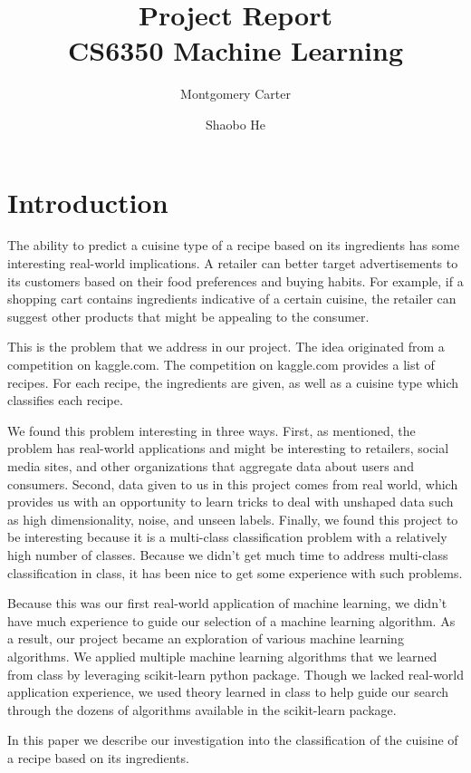 \documentclass[11pt]{article}
\title{Project Report\\CS6350 Machine Learning}
\author{Montgomery Carter \and Shaobo He}
\begin{document}
\maketitle

\section{Introduction}
The ability to predict a cuisine type of a recipe based on its
ingredients has some interesting real-world implications.  A retailer
can better target advertisements to its customers based on their food
preferences and buying habits.  For example, if a shopping cart
contains ingredients indicative of a certain cuisine, the retailer can
suggest other products that might be appealing to the consumer.

This is the problem that we address in our project.  The idea
originated from a competition on kaggle.com\cite{kaggle-link}. The
competition on  kaggle.com provides a list of recipes.  For each
recipe, the ingredients are given, as well as a cuisine type which
classifies each recipe.

We found this problem interesting in three ways. First, as mentioned,
the problem has real-world applications and might be interesting to
retailers, social media sites, and other organizations that aggregate
data about users and consumers.  Second, data given to us in this
project comes from real world, which provides us with an opportunity
to learn tricks to deal with unshaped data such as high
dimensionality, noise, and unseen labels.  Finally, we found this 
project to be interesting because it is a multi-class classification
problem with a relatively high number of classes.  Because we didn't
get much time to address multi-class classification in class, it has
been nice to get some experience with such problems.

Because this was our first real-world application of machine learning,
we didn't have much experience to guide our selection of a machine
learning algorithm.  As a result, our project became an exploration of
various machine learning algorithms.  We applied multiple machine
learning algorithms that we learned from class by leveraging
scikit-learn python package. Though we lacked real-world application
experience, we used theory learned in class to help guide our search
through the dozens of algorithms available in the scikit-learn
package.

In this paper we describe our investigation into the classification of
the cuisine of a recipe based on its ingredients.
\end{document}
